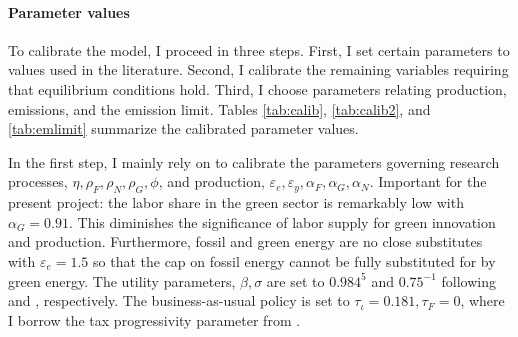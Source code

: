 \paragraph{Parameter values}
To calibrate the model, I proceed in three steps. First, I set certain parameters to values used in the literature. Second, I calibrate the remaining variables requiring that equilibrium conditions hold. Third, I choose parameters relating production, emissions, and the emission limit. Tables \ref{tab:calib}, \ref{tab:calib2}, and \ref{tab:emlimit} summarize the calibrated parameter values.

In the first step, I mainly rely on \cite{Fried2018ClimateAnalysis} to calibrate the parameters governing research processes, $\eta, \rho_F,\rho_N, \rho_G, \phi $, and production, $\varepsilon_e, \varepsilon_y, \alpha_F, \alpha_G, \alpha_N$.  Important for the present project: the labor share in the green sector is remarkably low with $\alpha_G=0.91$. This diminishes the significance of labor supply for green innovation and production. Furthermore, fossil and green energy are no close substitutes with $\varepsilon_e=1.5$ so that the cap on fossil energy cannot be fully substituted for by green energy. The utility parameters, $\beta, \sigma$ are set to $0.984^5$ and $0.75^{-1}$ following \cite{Barrage2019OptimalPolicy} and \cite{Chetty2011AreMargins}, respectively. The business-as-usual policy is set to $\tau_\iota=0.181, \tau_F=0$, where I borrow the tax progressivity parameter from \cite{Heathcote2017OptimalFramework}. 

